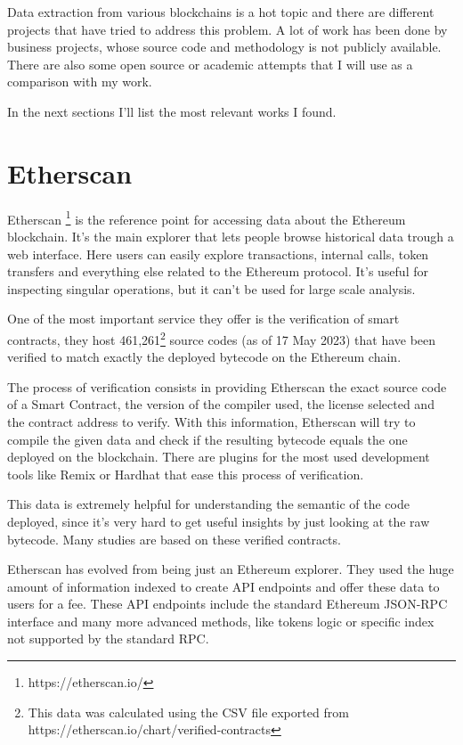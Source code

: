 
Data extraction from various blockchains is a hot topic and there are different projects that have tried to address this problem. A lot of work has been done by business projects, whose source code and methodology is not publicly available. There are also some open source or academic attempts that I will use as a comparison with my work. 

\noindent In the next sections I'll list the most relevant works I found.

\section{Etherscan}

Etherscan \footnote{https://etherscan.io/} is the reference point for accessing data about the Ethereum blockchain. It’s the main explorer that lets people browse historical data trough a web interface. Here users can easily explore transactions, internal calls, token transfers and everything else related to the Ethereum protocol. It’s useful for inspecting singular operations, but it can’t be used for large scale analysis.

One of the most important service they offer is the verification of smart contracts, they host 461,261\footnote{This data was calculated using the CSV file exported from https://etherscan.io/chart/verified-contracts} source codes (as of 17 May 2023) that have been verified to match exactly the deployed bytecode on the  Ethereum chain. 

The process of verification consists in providing Etherscan the exact source code of a Smart Contract, the version of the compiler used, the license selected and the contract address to verify. With this information, Etherscan will try to compile the given data and check if the resulting bytecode equals the one deployed on the blockchain. There are plugins for the most used development tools like Remix or Hardhat that ease this process of verification.

This data is extremely helpful for understanding the semantic of the code deployed, since it's very hard to get useful insights by just looking at the raw bytecode. Many studies are based on these verified contracts.

Etherscan has evolved from being just an Ethereum explorer. They used the huge amount of information indexed to create API endpoints and offer these data to users for a fee. These API endpoints include the standard Ethereum JSON-RPC interface and many more advanced methods, like tokens logic or specific index not supported by the standard RPC. 

